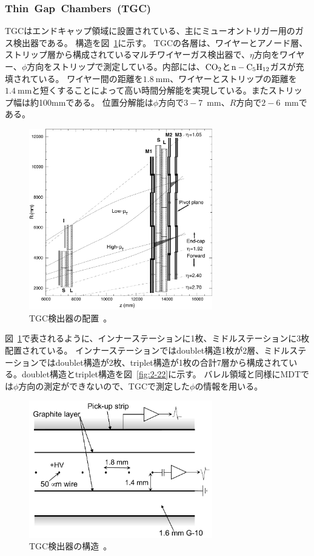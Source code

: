 \subsubsection{Thin~Gap~Chambers~(TGC)}
TGCはエンドキャップ領域に設置されている、主にミューオントリガー用のガス検出器である。
構造を図~\ref{fig:2-20}に示す。
TGCの各層は、ワイヤーとアノード層、ストリップ層から構成されているマルチワイヤーガス検出器で、$\eta$方向をワイヤー、$\phi$方向をストリップで測定している。内部には、$\rm{CO_{2}}$と$\rm{n - C_{5}H_{12}}$ガスが充填されている。
ワイヤー間の距離を$\SI{1.8}{\mm}$、ワイヤーとストリップの距離を$\SI{1.4}{\mm}$と短くすることによって高い時間分解能を実現している。またストリップ幅は約100mmである。
位置分解能は$\phi$方向で$3-7$~$\si{\mm}$、$R$方向で$2-6$~$\si{\mm}$である。

\begin{figure}[h]
  \centering
  \includegraphics[clip, width=8cm]{fig/2/l1mue-schema.pdf}
  \caption{TGC検出器の配置~\cite{Aad:1129811}。}
  \label{fig:2-20}
\end{figure}

図~\ref{fig:2-20}で表されるように、インナーステーションに1枚、ミドルステーションに3枚配置されている。
インナーステーションではdoublet構造1枚が2層、ミドルステーションではdoublet構造が2枚、triplet構造が1枚の合計7層から構成されている。doublet構造とtriplet構造を図~\ref{fig:2-22}に示す。
バレル領域と同様にMDTでは$\phi$方向の測定ができないので、TGCで測定した$\phi$の情報を用いる。

\begin{figure}[h]
  \centering
  \includegraphics[clip, width=8cm]{fig/2/TGC_anode_wire.pdf}
  \caption{TGC検出器の構造~\cite{Aad:1129811}。}
  \label{fig:2-21}
\end{figure}

